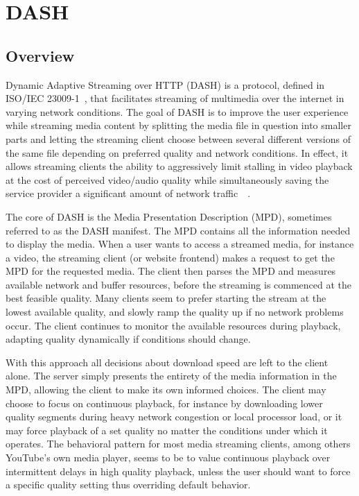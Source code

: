 \section{DASH}

\subsection{Overview}

Dynamic Adaptive Streaming over HTTP (DASH) is a protocol, defined in
ISO/IEC 23009-1~\cite{iso-dash-2014}, that facilitates 
streaming of multimedia over the internet in varying network conditions.
The goal of DASH is to improve the user
experience while streaming media content by splitting the media file in question
into smaller parts and letting the streaming client choose between several
different versions of the same file depending on preferred quality and network
conditions. In effect, it allows streaming clients the ability to aggressively
limit stalling in video playback at the cost of perceived video/audio quality
while simultaneously saving the service provider a significant amount of
network traffic~\cite[p. 412]{dashing-youtube}~\cite{Google I/O 2013}.

The core of DASH is the Media Presentation Description (MPD), sometimes
referred to as the DASH manifest. The MPD contains all the information
needed to display the media. When a user wants to access a streamed
media, for instance a video, the streaming client (or website frontend)
makes a request to get the MPD for the requested media. The client then
parses the MPD and measures available network and buffer resources,
before the streaming is commenced at the best feasible quality. Many clients %
seem to prefer starting the stream at the lowest available quality, and
slowly ramp the quality up if no network problems occur. The
client continues to monitor the available resources during playback, adapting
quality dynamically if conditions should change.

With this approach all decisions about download speed are left to the client
alone.
The server simply presents the entirety of the media information in the MPD,
allowing the client to make its own informed choices. The client may choose
to focus on continuous playback, for instance by downloading lower quality
segments during heavy network congestion or local processor load, or it may
force playback of a set quality no matter the conditions under which it
operates. The behavioral pattern for most media streaming clients, among
others YouTube's own media player, seems to be to value continuous playback
over intermittent delays in high quality playback, unless the user should want
to force a specific quality setting thus overriding default behavior.

